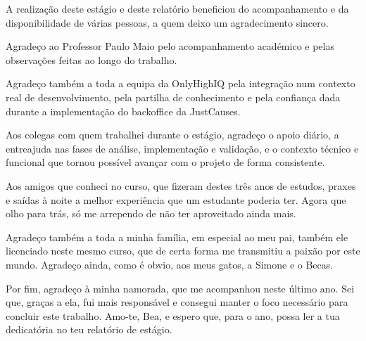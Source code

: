
\begin{acknowledgements}

A realização deste estágio e deste relatório beneficiou do acompanhamento e da disponibilidade de várias pessoas, a quem deixo um agradecimento sincero.

Agradeço ao Professor Paulo Maio pelo acompanhamento académico e pelas observações feitas ao longo do trabalho.

Agradeço também a toda a equipa da OnlyHighIQ pela integração num contexto real de desenvolvimento, pela partilha de conhecimento e pela confiança dada durante a implementação do backoffice da JustCauses.

Aos colegas com quem trabalhei durante o estágio, agradeço o apoio diário, a entreajuda nas fases de análise, implementação e validação, e o contexto técnico e funcional que tornou possível avançar com o projeto de forma consistente.

Aos amigos que conheci no curso, que fizeram destes três anos de estudos, praxes e saídas à noite a melhor experiência que um estudante poderia ter. Agora que olho para trás, só me arrependo de não ter aproveitado ainda mais.

Agradeço também a toda a minha família, em especial ao meu pai, também ele licenciado neste mesmo curso, que de certa forma me transmitiu a paixão por este mundo. Agradeço ainda, como é obvio, aos meus gatos, a Simone e o Becas.

Por fim, agradeço à minha namorada, que me acompanhou neste último ano. Sei que, graças a ela, fui mais responsável e consegui manter o foco necessário para concluir este trabalho. Amo-te, Bea, e espero que, para o ano, possa ler a tua dedicatória no teu relatório de estágio.

\end{acknowledgements}



\tableofcontents %

\listoffigures %

